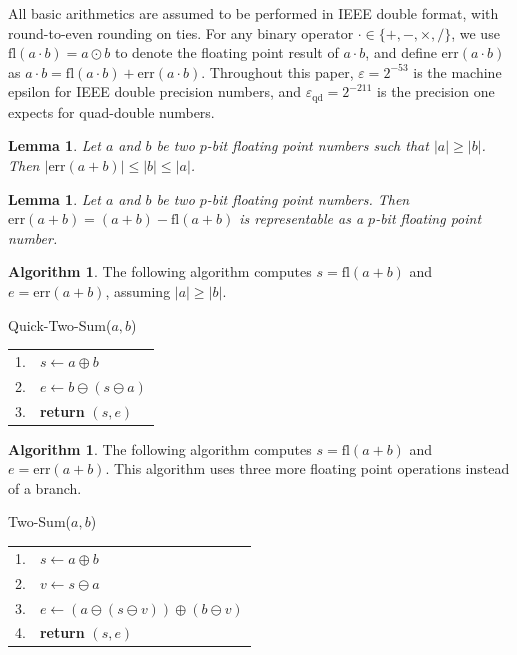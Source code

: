 \documentclass[11pt]{article}
\newtheorem{lem}[thm]{Lemma}
\theoremstyle{definition}
\newtheorem{alg}[thm]{Algorithm}
\newcommand{\fl}{\mathrm{fl}}
\newcommand{\err}{\mathrm{err}}
\newcommand{\eps}{\varepsilon}
\newcommand{\epsqd}{\varepsilon_\mathrm{qd}}
\begin{document}
All basic arithmetics are assumed to be performed in IEEE double format, 
with round-to-even rounding on ties.  For any binary operator 
$\cdot \in \{+, -, \times, /\}$, we use $\fl(a \cdot b) = a \odot b$ to denote
the floating point result of $a \cdot b$, and define $\err(a \cdot b)$
as $a \cdot b = \fl(a \cdot b) + \err(a \cdot b)$.
Throughout this paper, $\eps = 2^{-53}$ is the machine epsilon for
IEEE double precision numbers, and $\epsqd = 2^{-211}$ is
the precision one expects for quad-double numbers.

\begin{lem} {\rm \cite[p. 310]{she97}}
  Let $a$ and $b$ be two $p$-bit floating point numbers such that
  $|a| \ge |b|$.  Then $|\err(a+b)| \le |b| \le |a|$.
\end{lem}

\begin{lem} {\rm \cite[p. 311]{she97}}
  Let $a$ and $b$ be two $p$-bit floating point numbers.  Then
  $\err(a+b) = (a + b) - \fl(a+b)$ is representable as a $p$-bit
  floating point number.
\end{lem}

\begin{alg} \cite[p. 312]{she97}
  The following algorithm computes $s = \fl(a+b)$ and $e = \err(a+b)$, 
  assuming $|a| \ge |b|$.

  \vspace{0.1in}
  \hfill
  \begin{minipage}[t]{4in}
    {\sc Quick-Two-Sum}($a, b$) \\
    \begin{tabular}{rl}
      1. & $s \leftarrow a \oplus b$ \\
      2. & $e \leftarrow b \ominus (s \ominus a)$ \\
      3. & {\bf return} $(s, e)$
    \end{tabular}
  \end{minipage}
\end{alg}

\begin{alg} \cite[p. 314]{she97}
  The following algorithm computes $s = \fl(a+b)$ and $e = \err(a+b)$.
  This algorithm uses three more floating point operations instead of
  a branch.

  \vspace{0.1in}
  \hfill
  \begin{minipage}[t]{4in}
    {\sc Two-Sum}($a, b$) \\
    \begin{tabular}{rl}
      1. & $s \leftarrow a \oplus b$ \\
      2. & $v \leftarrow s \ominus a$ \\
      3. & $e \leftarrow (a \ominus (s \ominus v)) \oplus (b \ominus v)$ \\
      4. & {\bf return} $(s, e)$
    \end{tabular}
  \end{minipage}
\end{alg}
\end{document}
